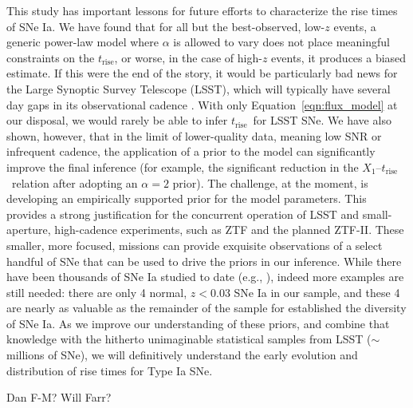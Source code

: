 \documentclass[twocolumn]{./aastex63}
\newcommand{\trise}{$t_\mathrm{rise}$}
\begin{document}
This study has important lessons for future efforts to characterize the rise
times of SNe Ia. We have found that for all but the best-observed, low-$z$
events, a generic power-law model where $\alpha$ is allowed to vary does not
place meaningful constraints on the \trise, or worse, in the case of high-$z$
events, it produces a biased estimate. If this were the end of the story, it
would be particularly bad news for the Large Synoptic Survey Telescope (LSST),
which will typically have several day gaps in its observational cadence
\citep{Ivezic08}. With only Equation~\ref{eqn:flux_model} at our disposal, we
would rarely be able to infer \trise\ for LSST SNe. We have also shown, however,
that in the limit of lower-quality data, meaning low SNR or infrequent cadence,
the application of a prior to the model can significantly improve the final
inference (for example, the significant reduction in the $X_1$--\trise\ relation
after adopting an $\alpha = 2$ prior). The challenge, at the moment, is
developing an empirically supported prior for the model parameters. This
provides a strong justification for the concurrent operation of LSST and
small-aperture, high-cadence experiments, such as ZTF and the planned ZTF-II.
These smaller, more focused, missions can provide exquisite observations of a
select handful of SNe that can be used to drive the priors in our inference.
While there have been thousands of SNe Ia studied to date (e.g.,
\citealt{Jones17}), indeed more examples are still needed: there are only 4
normal, $z < 0.03$ SNe Ia in our sample, and these 4 are nearly as valuable as
the remainder of the sample for established the diversity of SNe Ia. As we
improve our understanding of these priors, and combine that knowledge with the
hitherto unimaginable statistical samples from LSST ($\sim$millions of SNe), we
will definitively understand the early evolution and distribution of rise times
for Type Ia SNe.


\acknowledgements

Dan F-M? Will Farr?


\end{document}
